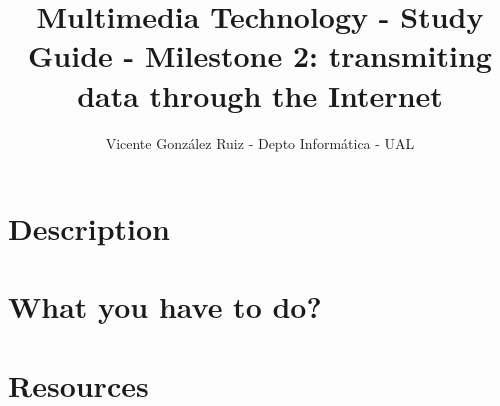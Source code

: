 \title{Multimedia Technology - Study Guide - Milestone 2: transmiting data through the Internet}
\author{Vicente González Ruiz - Depto Informática - UAL}

\section{Description}

\section{What you have to do?}

\section{Resources}

